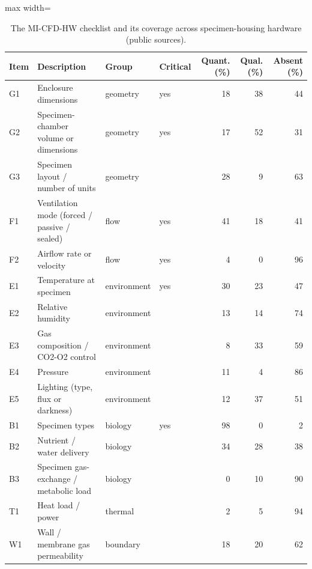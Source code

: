 \begin{table}[htbp]\centering\footnotesize
\caption{The MI-CFD-HW checklist and its coverage across specimen-housing hardware (public sources).}\label{tab:items}
\begin{adjustbox}{max width=\linewidth}
\begin{tabular}{llllrrr}
\toprule
Item & Description & Group & Critical & Quant. (\%) & Qual. (\%) & Absent (\%) \\
\midrule
G1 & Enclosure dimensions & geometry & yes & 18 & 38 & 44 \\
G2 & Specimen-chamber volume or dimensions & geometry & yes & 17 & 52 & 31 \\
G3 & Specimen layout / number of units & geometry &  & 28 & 9 & 63 \\
F1 & Ventilation mode (forced / passive / sealed) & flow & yes & 41 & 18 & 41 \\
F2 & Airflow rate or velocity & flow & yes & 4 & 0 & 96 \\
E1 & Temperature at specimen & environment & yes & 30 & 23 & 47 \\
E2 & Relative humidity & environment &  & 13 & 14 & 74 \\
E3 & Gas composition / CO2-O2 control & environment &  & 8 & 33 & 59 \\
E4 & Pressure & environment &  & 11 & 4 & 86 \\
E5 & Lighting (type, flux or darkness) & environment &  & 12 & 37 & 51 \\
B1 & Specimen types & biology & yes & 98 & 0 & 2 \\
B2 & Nutrient / water delivery & biology &  & 34 & 28 & 38 \\
B3 & Specimen gas-exchange / metabolic load & biology &  & 0 & 10 & 90 \\
T1 & Heat load / power & thermal &  & 2 & 5 & 94 \\
W1 & Wall / membrane gas permeability & boundary &  & 18 & 20 & 62 \\
\bottomrule
\end{tabular}
\end{adjustbox}
\end{table}

